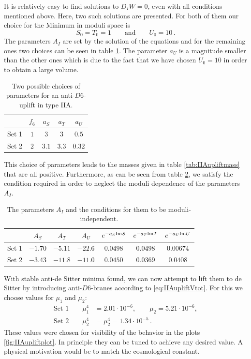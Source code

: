 \documentclass[12pt]{report}
\newcommand{\be}{\begin{equation}}
\newcommand{\ee}{\end{equation}}
\newcommand{\bea}{\begin{equation}\begin{aligned}}
\newcommand{\eea}{\end{aligned}\end{equation}}
\begin{document}
It is relatively easy to find solutions to $D_IW=0$, even with all conditions mentioned above. Here, two such solutions are presented. For both of them our choice for the Minimum in moduli space is
\be 
S_0 = T_0=1 \qquad \text{and}\qquad U_0=10\,.
\ee
The parameters $A_I$ are set by the solution of the equations and for the remaining ones two choices can be seen in table \ref{tab:IIAupliftpar}. The parameter $a_U$ is a magnitude smaller than the other ones which is due to the fact that we have chosen $U_0=10$ in order to obtain a large volume.
\begin{table}[H]
\center
\begin{tabular}{|c|c|c|c|c|}\hline
 & $f_6$ & $a_S$ & $a_T$ & $a_U$ \\\hline
Set 1 & $1$ & $3$ & $3$ & $0.5$ \\\hline
Set 2 &$2$ & $3.1$ & $3.3$ & $0.32$ \\\hline
\end{tabular}
\caption{Two possible choices of parameters for an anti-$D6$-uplift in type IIA.}
\label{tab:IIAupliftpar}
\end{table}
This choice of parameters leads to the masses given in table \ref{tab:IIAupliftmass} that are all positive. Furthermore, as can be seen from table \ref{tab:IIAupliftreq}, we satisfy the condition required in order to neglect the moduli dependence of the parameters $A_I$.
\begin{table}[H]
\center
\begin{tabular}{|c|c|c|c||c|c|c|}\hline
 & $A_S$ & $A_T$ & $A_U$  & $e^{-a_S {\rm Im} S}$ & $e^{-a_T {\rm Im} T}$ & $e^{-a_U {\rm Im} U}$  \\\hline
Set 1 & $-1.70$ & $-5.11$ & $-22.6$ & $0.0498$ & $0.0498$ & $0.00674$  \\\hline
Set 2 & $-3.43$ & $-11.8$ & $-11.0$ & $0.0450$ & $0.0369$ & $0.0408$  \\\hline
\end{tabular}
\caption{The parameters $A_I$ and the conditions for them to be moduli-independent.}
\label{tab:IIAupliftreq}
\end{table}
With stable anti-de Sitter minima found, we can now attempt to lift them to de Sitter by introducing anti-$D6$-branes according to \eqref{eq:IIAupliftVtot}. For this we choose values for $\mu_1$ and $\mu_2$:
\bea 
\text{Set 1} \qquad \mu_1^4 &= 2.01 \cdot 10^{-6}, \qquad \mu_2 = 5.21 \cdot 10^{-6},\\
\text{Set 2} \qquad \mu_2^4 &= \mu_2^4 = 1.34 \cdot 10^{-5}\,.
\eea
These values were chosen for visibility of the behavior in the plots \ref{fig:IIAupliftplot}. In principle they can be tuned to achieve any desired value. A physical motivation would be to match the cosmological constant.\\
\end{document}

